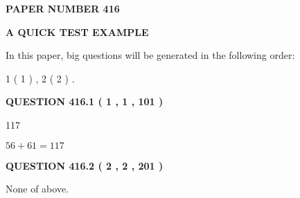 \documentclass[12pt]{article}
\begin{document}
 
 
 
 
   
   
\newpage 
\setcounter{page}{ 
   416001 } 
   
   
   
   
 {\textbf{ \Large{ PAPER NUMBER  416  }}}
   
   
\vspace{0.2in}
   
   
   
   
   
   
 \vspace{0.2in}
{\LARGE {\textbf{ A QUICK TEST EXAMPLE}}}
   
   
   
\vspace{0.2in}
   
In this paper, big questions will be generated in the following order: 
   
   
   1 ( 1 )
 ,
   2 ( 2 )
 .
  
\vspace{0.2in}
  
{\textbf{\Large{QUESTION
416.1 
 ( 1 , 1 , 101 )
}}}
  
  
 
 
\noindent{}

117
 
 
 
 
\noindent{}

$ %
56 +  %
61=   %
117$
 
 
  
\vspace{0.2in}
  
{\textbf{\Large{QUESTION
416.2 
 ( 2 , 2 , 201 )
}}}
  
  
 
 
\noindent{}
 
 
 None of above.
 
 
 
 
   
   
 \vspace{0.2in}
 
   
   
\end{document}
